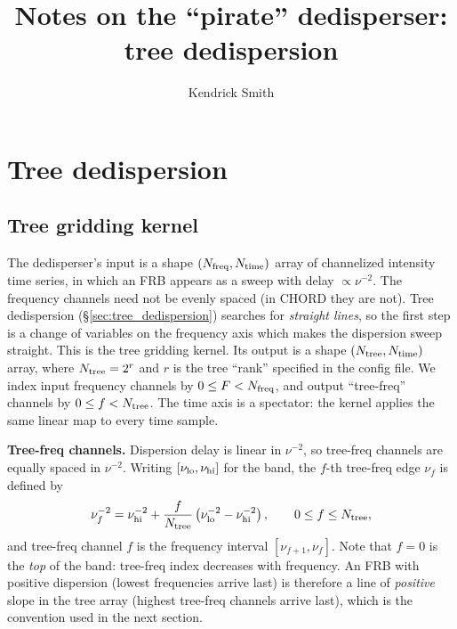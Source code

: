 \documentclass{article}
\title{Notes on the ``pirate'' dedisperser: tree dedispersion}
\author{Kendrick Smith}
\numberwithin{equation}{section}   %
\begin{document}
\maketitle

\tableofcontents

\setlength{\parskip}{2.5pt}  %

\clearpage

\section{Tree dedispersion}
\label{sec:tree_dedispersion_top}

\subsection{Tree gridding kernel}
\label{sec:gridding}

The dedisperser's input is a shape $(N_{\rm freq}, N_{\rm time})$ array of channelized intensity time series, in which an FRB appears as a sweep with delay $\propto \nu^{-2}$.
The frequency channels need not be evenly spaced (in CHORD they are not).
Tree dedispersion (\S\ref{sec:tree_dedispersion}) searches for {\em straight lines}, so the first step is a change of variables on the frequency axis which makes the dispersion sweep straight.
This is the tree gridding kernel.
Its output is a shape $(N_{\rm tree}, N_{\rm time})$ array, where $N_{\rm tree} = 2^r$ and $r$ is the tree ``rank'' specified in the config file.
We index input frequency channels by $0 \le F < N_{\rm freq}$, and output ``tree-freq'' channels by $0 \le f < N_{\rm tree}$.
The time axis is a spectator: the kernel applies the same linear map to every time sample.

\par\noindent
{\bf Tree-freq channels.}
Dispersion delay is linear in $\nu^{-2}$, so tree-freq channels are equally spaced in $\nu^{-2}$.
Writing $[\nu_{\rm lo}, \nu_{\rm hi}]$ for the band, the $f$-th tree-freq edge $\nu_f$ is defined by
\begin{equation}
\nu_f^{-2} = \nu_{\rm hi}^{-2} + \frac{f}{N_{\rm tree}} \left( \nu_{\rm lo}^{-2} - \nu_{\rm hi}^{-2} \right),
  \qquad 0 \le f \le N_{\rm tree},
\end{equation}
and tree-freq channel $f$ is the frequency interval $[\nu_{f+1}, \nu_f]$.
Note that $f = 0$ is the {\em top} of the band: tree-freq index decreases with frequency.
An FRB with positive dispersion (lowest frequencies arrive last) is therefore a line of {\em positive} slope in the tree array (highest tree-freq channels arrive last), which is the convention used in the next section.
\end{document}
